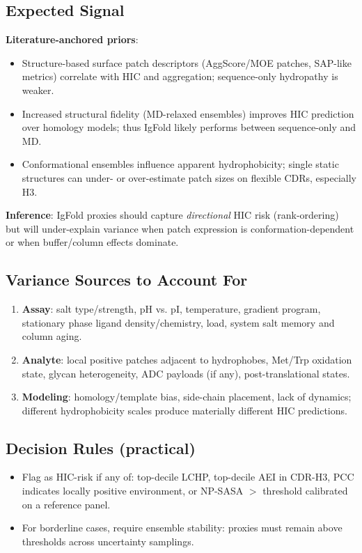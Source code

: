 \subsection*{Expected Signal}
\textbf{Literature-anchored priors}:
\begin{itemize}
\item Structure-based surface patch descriptors (AggScore/MOE patches, SAP-like metrics) correlate with HIC and aggregation; sequence-only hydropathy is weaker. 
\item Increased structural fidelity (MD-relaxed ensembles) improves HIC prediction over homology models; thus IgFold likely performs between sequence-only and MD. 
\item Conformational ensembles influence apparent hydrophobicity; single static structures can under- or over-estimate patch sizes on flexible CDRs, especially H3.
\end{itemize}
\textbf{Inference}: IgFold proxies should capture \emph{directional} HIC risk (rank-ordering) but will under-explain variance when patch expression is conformation-dependent or when buffer/column effects dominate.

\subsection*{Variance Sources to Account For}
\begin{enumerate}
\item \textbf{Assay}: salt type/strength, pH vs. pI, temperature, gradient program, stationary phase ligand density/chemistry, load, system salt memory and column aging.
\item \textbf{Analyte}: local positive patches adjacent to hydrophobes, Met/Trp oxidation state, glycan heterogeneity, ADC payloads (if any), post-translational states.
\item \textbf{Modeling}: homology/template bias, side-chain placement, lack of dynamics; different hydrophobicity scales produce materially different HIC predictions.
\end{enumerate}

\subsection*{Decision Rules (practical)}
\begin{itemize}
\item Flag as HIC-risk if any of: top-decile LCHP, top-decile AEI in CDR-H3, PCC indicates locally positive environment, or NP-SASA $>$ threshold calibrated on a reference panel.
\item For borderline cases, require ensemble stability: proxies must remain above thresholds across uncertainty samplings.
\end{itemize}

